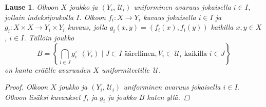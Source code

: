 \documentclass[12pt,a4paper,leqno]{report}
\newcommand{\N}{\mathbb{N}}
\newcommand{\U}{\,\mathcal{U}}
\theoremstyle{plain}
\newtheorem{lause}[equation]{Lause}
\theoremstyle{definition}
\theoremstyle{remark}
\begin{document}
\begin{lause}\label{kuvausperheen indusoima lause}
%
Olkoon $X$ joukko ja $(Y_i,\U_i)$ uniforminen avaruus jokaisella $i\in I$, jollain indeksijoukolla $I$. 
Olkoon $f_i\colon X\rightarrow Y_i$ kuvaus jokaisella $i\in I$ ja  
$g_i\colon X\times X\rightarrow Y_i\times Y_i$ kuvaus, jolla $g_i(x,y)=(f_i(x), f_i(y))$ kaikilla $x,y\in X$, 
$i\in I$.
Tällöin joukko 
$$B=\left\{\bigcap_{i\in J}g^{\leftarrow}_{i}(V_{i})
\mid J\subset I\text{ äärellinen},V_{i} \in\U_{i}\text{ kaikilla } i\in J\right\}$$
on kanta eräälle avaruuden $X$ uniformiteetille $\U$. 
%
\begin{proof}
Olkoon $X$ joukko ja $(Y_i,\U_i)$ uniforminen avaruus jokaisella $i\in I$. 
Olkoon lisäksi kuvaukset $f_i$ ja $g_i$ ja joukko $B$ kuten yllä.

\end{proof}
\end{lause}
\end{document}
